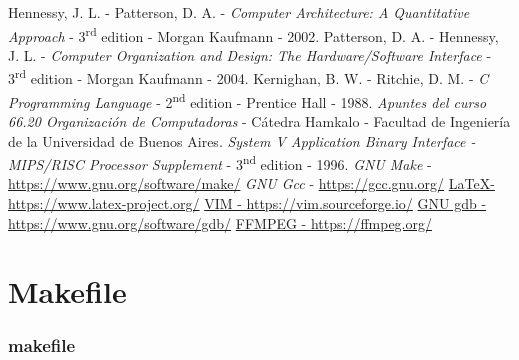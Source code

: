 \documentclass[a4paper,12pt]{article}
\numberwithin{equation}{section}
\numberwithin{figure}{section}
\begin{document}
	\clearpage
	\begin{thebibliography}{10}
		 Hennessy, J. L. - Patterson, D. A. - \emph{Computer Architecture: A Quantitative Approach} - 3\textsuperscript{rd} edition - Morgan Kaufmann - 2002.
		 Patterson, D. A. - Hennessy, J. L. - \emph{Computer Organization and Design: The Hardware/Software Interface} - 3\textsuperscript{rd} edition - Morgan Kaufmann - 2004.
		 Kernighan, B. W. - Ritchie, D. M. - \emph{C Programming Language} - 2\textsuperscript{nd} edition - Prentice Hall - 1988.
		 \emph{Apuntes del curso 66.20 Organización de Computadoras} - Cátedra Hamkalo - Facultad de Ingeniería de la Universidad de Buenos Aires.
		 \emph{System V Application Binary Interface - MIPS/RISC Processor Supplement} - 3\textsuperscript{nd} edition - 1996.
		 \emph{GNU Make} - \hyperlink{make}{https://www.gnu.org/software/make/}
		 \emph{GNU Gcc} - \hyperlink{gcc}{https://gcc.gnu.org/}
		\href{https://www.latex-project.org/}{\LaTeX - https://www.latex-project.org/}
		\href{https://vim.sourceforge.io/}{VIM - https://vim.sourceforge.io/}
		\href{https://www.gnu.org/software/gdb/}{GNU gdb - https://www.gnu.org/software/gdb/}
		\href{https://ffmpeg.org/}{FFMPEG - https://ffmpeg.org/}
	\end{thebibliography}
	\clearpage
	
	\appendix
	
	
	
	
	\section{Makefile}\label{appendix_makefile}
	
	\subsubsection{makefile}\label{app_makefile}
	
	\clearpage
	
\end{document}
